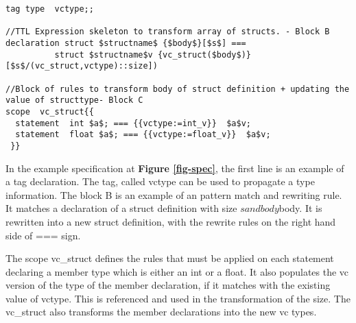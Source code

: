 \documentclass[preprint]{sigplanconf}
\begin{document}
\begin{figure*}

\caption{Introducing VC}
\label{fig-vc2}
\end{figure*}
\begin{figure*}

\begin{lstlisting}
tag type  vctype;;

//TTL Expression skeleton to transform array of structs. - Block B
declaration struct $structname$ {$body$}[$s$] === 
          struct $structname$v {vc_struct($body$)}[$s$/(vc_struct,vctype)::size])

//Block of rules to transform body of struct definition + updating the value of structtype- Block C
scope  vc_struct{{   
  statement  int $a$; === {{vctype:=int_v}}  $a$v;
  statement  float $a$; === {{vctype:=float_v}}  $a$v; 
 }}
\end{lstlisting}

\caption{Specification sample}
\label{fig-spec}
\end{figure*}

In the example specification at \textbf{Figure \ref{fig-spec}}, the first line is an example of a tag declaration. The tag, called vctype can be used to propagate a type information. 
The block B is an example of an pattern match and rewriting rule. It matches a declaration of a struct definition with size $s and body $body. It is rewritten into a new struct definition, with the rewrite rules on the right hand side of === sign.

The scope vc\_struct defines the rules that must be applied on each statement declaring a member type which is either an int or a float. It also populates the vc version of the type of the member declaration, if it matches with the existing value of vctype. This is referenced and used in the transformation of the size. The vc\_struct also transforms the member declarations into the new vc types. 
\end{document}
